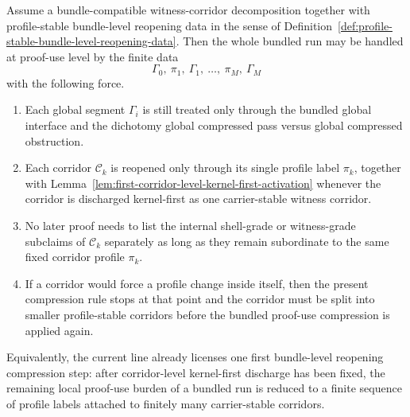 \begin{proposition}
\label{prop:first-bundle-level-reopening-compression-principle}
Assume a bundle-compatible witness-corridor decomposition together with profile-stable bundle-level reopening data in the sense of Definition~\ref{def:profile-stable-bundle-level-reopening-data}. Then the whole bundled run may be handled at proof-use level by the finite data
\[
\Gamma_0,\ \pi_1,\ \Gamma_1,\ \ldots,\ \pi_M,\ \Gamma_M
\]
with the following force.
\begin{enumerate}[leftmargin=2em,label=(\roman*)]
\item Each global segment $\Gamma_i$ is still treated only through the bundled global interface and the dichotomy global compressed pass versus global compressed obstruction.
\item Each corridor $\mathcal C_k$ is reopened only through its single profile label $\pi_k$, together with Lemma~\ref{lem:first-corridor-level-kernel-first-activation} whenever the corridor is discharged kernel-first as one carrier-stable witness corridor.
\item No later proof needs to list the internal shell-grade or witness-grade subclaims of $\mathcal C_k$ separately as long as they remain subordinate to the same fixed corridor profile $\pi_k$.
\item If a corridor would force a profile change inside itself, then the present compression rule stops at that point and the corridor must be split into smaller profile-stable corridors before the bundled proof-use compression is applied again.
\end{enumerate}
Equivalently, the current line already licenses one first bundle-level reopening compression step: after corridor-level kernel-first discharge has been fixed, the remaining local proof-use burden of a bundled run is reduced to a finite sequence of profile labels attached to finitely many carrier-stable corridors.
\end{proposition}

